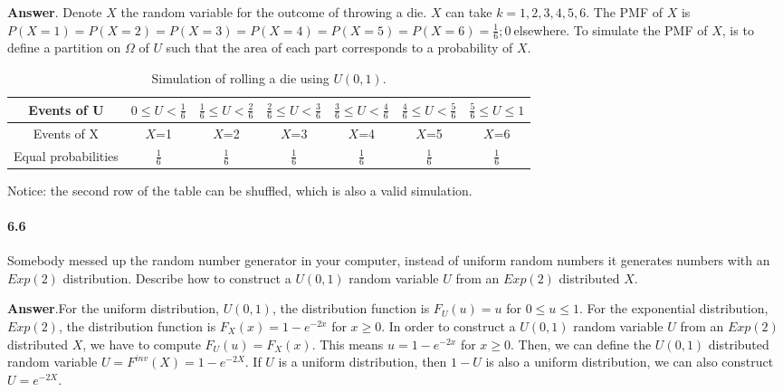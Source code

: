 \documentclass[11pt]{article} %
\begin{document}
\textbf{Answer}. Denote $X$ the random variable for the outcome of throwing a die. $X$ can take $k={1,2,3,4,5,6}$. The PMF of $X$ is $P(X=1) = P(X=2) = P(X=3) = P(X=4) = P(X=5) = P(X=6) = \frac{1}{6}; 0~$elsewhere. To simulate the PMF of $X$, is to define a partition on $\Omega$ of $U$ such that the area of each part corresponds to a probability of $X$.

\begin{table}[h!]
\renewcommand{\arraystretch}{1.5}
\centering
\caption{Simulation of rolling a die using $U(0, 1)$.}
\label{Ta:6.1a}
\begin{tabular}{|c|c|c|c|c|c|c|} \hline
Events of U & $0\leq U < \frac{1}{6}$ & $\frac{1}{6} \leq U < \frac{2}{6}$ & 
$\frac{2}{6} \leq U < \frac{3}{6}$ & $\frac{3}{6} \leq U < \frac{4}{6}$ & 
$\frac{4}{6} \leq U < \frac{5}{6}$ & $\frac{5}{6} \leq U \leq 1$ \\ \hline 
Events of X & $X$=1 & $X$=2 & $X$=3 & $X$=4 & $X$=5 & $X$=6 \\ \hline 
Equal probabilities & $\frac{1}{6}$ & $\frac{1}{6}$ & $\frac{1}{6}$ & $\frac{1}{6}$ & $\frac{1}{6}$ & $\frac{1}{6}$ \\ \hline 
\end{tabular}
\end{table}

Notice: the second row of the table can be shuffled, which is also a valid simulation.

\paragraph*{6.6} Somebody messed up the random number generator in your computer, instead of uniform random numbers it generates numbers with an $Exp(2)$ distribution. Describe how to construct a $U(0,1)$ random variable $U$ from an $Exp(2)$ distributed $X$. 

\textbf{Answer}.For the uniform distribution, $U(0, 1)$, the distribution function is $F_U(u) = u$ for $0 \leq u \leq 1$. For the exponential distribution, $Exp(2)$, the distribution function is $F_X(x) = 1 - e^{-2x}$ for $x \geq 0$. In order to construct a $U(0, 1)$ random variable $U$ from an $Exp(2)$ distributed $X$, we have to compute $F_U(u) = F_X(x)$. This means $u = 1-e^{-2x}$ for $x \geq 0$. Then, we can define the $U(0, 1)$ distributed random variable $U = F^{inv}(X) = 1-e^{-2X}$. If $U$ is a uniform distribution, then $1-U$ is also a uniform distribution, we can also construct $U = e^{-2X}$. 
\end{document}
